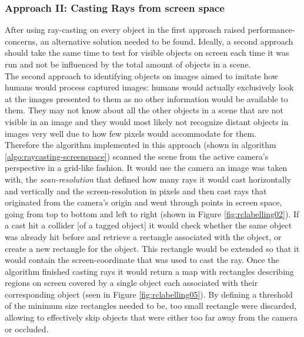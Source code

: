 \subsubsection{Approach II: Casting Rays from screen space}
After using ray-casting on every object in the first approach raised performance-concerns, an alternative solution needed to be found. Ideally, a second approach should take the same time to test for visible objects on screen each time it was run and not be influenced by the total amount of objects in a scene.\\
The second approach to identifying objects on images aimed to imitate how humans would process captured images: humans would actually exclusively look at the images presented to them as no other information would be available to them. They may not know about all the other objects in a scene that are not visible in an image and they would most likely not recognize distant objects in images very well due to how few pixels would accommodate for them.\\
Therefore the algorithm implemented in this approach (shown in algorithm \ref{algo:raycasting-screenspace}) scanned the scene from the active camera's perspective in a grid-like fashion. It would use the camera an image was taken with, the \textit{scan-resolution} that defined how many rays it would cast horizontally and vertically and the screen-resolution in pixels and then cast rays that originated from the camera's origin and went through points in screen space, going from top to bottom and left to right (shown in Figure \ref{fig:rclabelling02}). If a cast hit a collider [of a tagged object] it would check whether the same object was already hit before and retrieve a rectangle associated with the object, or create a new rectangle for the object. This rectangle would be extended so that it would contain the screen-coordinate that was used to cast the ray. Once the algorithm finished casting rays it would return a map with rectangles describing regions on screen covered by a single object each associated with their corresponding object (seen in Figure \ref{fig:rclabelling05}). By defining a threshold of the minimum size rectangles needed to be, too small rectangle were discarded, allowing to effectively skip objects that were either too far away from the camera or occluded.\\
